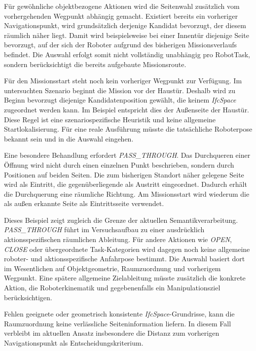 Für gewöhnliche objektbezogene Aktionen wird die Seitenwahl zusätzlich vom vorhergehenden Wegpunkt
abhängig gemacht. Existiert bereits ein vorheriger Navigationspunkt, wird grundsätzlich derjenige
Kandidat bevorzugt, der diesem räumlich näher liegt. Damit wird beispielsweise bei einer Innentür
diejenige Seite bevorzugt, auf der sich der Roboter aufgrund des bisherigen Missionsverlaufs
befindet. Die Auswahl erfolgt somit nicht vollständig unabhängig pro RobotTask, sondern
berücksichtigt die bereits aufgebaute Missionsroute.

Für den Missionsstart steht noch kein vorheriger Wegpunkt zur Verfügung. Im untersuchten Szenario
beginnt die Mission vor der Haustür. Deshalb wird zu Beginn bevorzugt diejenige Kandidatenposition
gewählt, die keinem \textit{IfcSpace} zugeordnet werden kann. Im Beispiel entspricht dies der
Außenseite der Haustür. Diese Regel ist eine szenariospezifische Heuristik und keine allgemeine
Startlokalisierung. Für eine reale Ausführung müsste die tatsächliche Roboterpose bekannt sein und
in die Auswahl eingehen.

Eine besondere Behandlung erfordert \textit{PASS\_THROUGH}. Das Durchqueren einer Öffnung wird nicht
durch einen einzelnen Punkt beschrieben, sondern durch Positionen auf beiden Seiten. Die zum
bisherigen Standort näher gelegene Seite wird als Eintritt, die gegenüberliegende als Austritt
eingeordnet. Dadurch erhält die Durchquerung eine räumliche Richtung. Am Missionsstart wird wiederum
die als außen erkannte Seite als Eintrittsseite verwendet.

Dieses Beispiel zeigt zugleich die Grenze der aktuellen Semantikverarbeitung. \textit{PASS\_THROUGH}
führt im Versuchsaufbau zu einer ausdrücklich aktionsspezifischen räumlichen Ableitung. Für andere
Aktionen wie \textit{OPEN}, \textit{CLOSE} oder übergeordnete Task-Kategorien wird dagegen noch
keine allgemeine roboter- und aktionsspezifische Anfahrpose bestimmt. Die Auswahl basiert dort im
Wesentlichen auf Objektgeometrie, Raumzuordnung und vorherigem Wegpunkt. Eine spätere allgemeine
Zielableitung müsste zusätzlich die konkrete Aktion, die Roboterkinematik und gegebenenfalls ein
Manipulationsziel berücksichtigen.

Fehlen geeignete oder geometrisch konsistente \textit{IfcSpace}-Grundrisse, kann die Raumzuordnung
keine verlässliche Seiteninformation liefern. In diesem Fall verbleibt im aktuellen Ansatz
insbesondere die Distanz zum vorherigen Navigationspunkt als Entscheidungskriterium.

